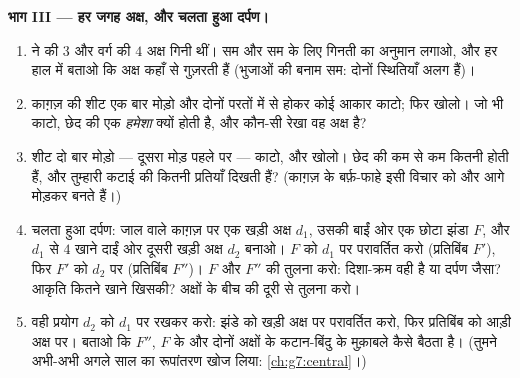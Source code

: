 \begin{problem}
\medskip
\noindent\textbf{भाग III --- हर जगह अक्ष, और चलता हुआ
दर्पण।}
\begin{enumerate}[resume]
  \item {} ने  की $3$
        और वर्ग की $4$ अक्ष गिनी थीं। सम  और सम  के
        लिए गिनती का अनुमान लगाओ, और हर हाल में बताओ कि अक्ष
        कहाँ से गुज़रती हैं (भुजाओं की  बनाम सम: दोनों
        स्थितियाँ अलग हैं)।
  \item काग़ज़ की शीट एक बार मोड़ो और दोनों परतों में से होकर कोई
        आकार काटो; फिर खोलो। जो भी काटो, छेद की एक 
        \emph{हमेशा} क्यों होती है, और कौन-सी रेखा वह अक्ष है?
  \item शीट दो बार मोड़ो --- दूसरा मोड़ पहले पर  --- काटो, और
        खोलो। छेद की कम से कम कितनी  होती हैं, और
        तुम्हारी कटाई की कितनी प्रतियाँ दिखती हैं? (काग़ज़ के
        बर्फ़-फाहे इसी विचार को और आगे मोड़कर बनते हैं।)
  \item चलता हुआ दर्पण: जाल वाले काग़ज़ पर एक खड़ी अक्ष $d_1$,
        उसकी बाईं ओर एक छोटा झंडा $F$, और $d_1$ से $4$ खाने
        दाईं ओर दूसरी खड़ी अक्ष $d_2$ बनाओ। $F$ को $d_1$ पर
        परावर्तित करो (प्रतिबिंब $F'$), फिर $F'$ को $d_2$ पर
        (प्रतिबिंब $F''$)। $F$ और $F''$ की तुलना करो: दिशा-क्रम
        वही है या दर्पण जैसा? आकृति कितने खाने खिसकी? अक्षों के
        बीच की दूरी से तुलना करो।
  \item वही प्रयोग $d_2$ को $d_1$ पर \emph{} रखकर करो: झंडे
        को खड़ी अक्ष पर परावर्तित करो, फिर प्रतिबिंब को आड़ी अक्ष
        पर। बताओ कि $F''$, $F$ के और दोनों अक्षों के कटान-बिंदु
        के मुक़ाबले कैसे बैठता है। (तुमने अभी-अभी अगले साल का
        रूपांतरण खोज लिया: \cref{ch:g7:central}।)
\end{enumerate}
\end{problem}
